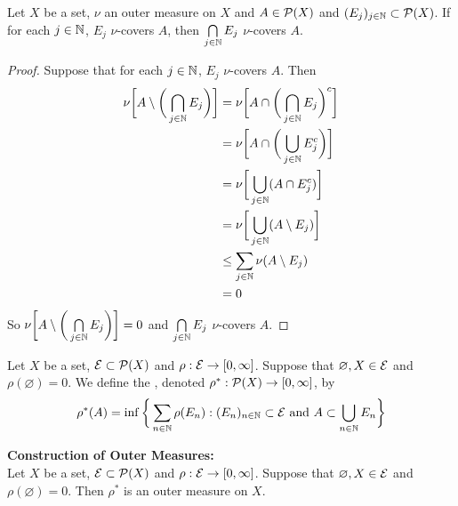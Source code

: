 \documentclass{book}
\begin{document}
	\begin{ex} 
		Let $X$ be a set, $\nu$ an outer measure on $X$ and $A \in \mathcal{P}(X)$ and $(E_j)_{j \in \mathbb{N}} \subset \mathcal{P}(X)$. If for each $j \in \mathbb{N}$, $E_j$ $\nu$-covers $A$, then $\bigcap\limits_{j \in \mathbb{N}} E_j$ $\nu$-covers $A$.
	\end{ex}

	\begin{proof}
		Suppose that for each $j \in \mathbb{N}$, $E_j$ $\nu$-covers $A$. Then 
		\begin{align*}
			\nu \bigg[ A \setminus \bigg( \bigcap_{j \in \mathbb{N}} E_j \bigg) \bigg]
			& = \nu \bigg[ A \cap \bigg( \bigcap_{j \in \mathbb{N}} E_j \bigg)^c \bigg] \\
			& = \nu \bigg[ A \cap \bigg( \bigcup_{j \in \mathbb{N}} E_j^c \bigg) \bigg] \\
			& = \nu \bigg[ \bigcup_{j \in \mathbb{N}} (A \cap E_j^c) \bigg] \\
			& = \nu \bigg[ \bigcup_{j \in \mathbb{N}} (A \setminus E_j) \bigg] \\
			& \leq \sum_{j \in \mathbb{N}} \nu(A \setminus E_j) \\
			& = 0
		\end{align*}
		So $\nu \bigg[ A \setminus \bigg( \bigcap\limits_{j \in \mathbb{N}} E_j \bigg) \bigg] = 0$ and $\bigcap\limits_{j \in \mathbb{N}} E_j$ $\nu$-covers $A$.
	\end{proof}

	
	\begin{defn}   
		Let $X$ be a set, $\mathcal{E} \subset \mathcal{P}(X)$ and $\rho: \mathcal{E} \rightarrow [0, \infty]$. Suppose that $\varnothing, X \in \mathcal{E}$ and $\rho(\varnothing) = 0$. We define the , denoted $\rho^*:\mathcal{P}(X) \rightarrow [0, \infty]$, by 
		$$\rho^*(A) = \inf \bigg \{\sum_{n \in \mathbb{N}}\rho(E_n): (E_n)_{n \in \mathbb{N}} \subset \mathcal{E} \text{ and }A \subset \bigcup_{n \in \mathbb{N}}E_n \bigg \}$$ 
	\end{defn}
	
	\begin{ex}\textbf{Construction of Outer Measures:}    \\
		Let $X$ be a set, $\mathcal{E} \subset \mathcal{P}(X)$ and $\rho: \mathcal{E} \rightarrow [0, \infty]$. Suppose that $\varnothing, X \in \mathcal{E}$ and $\rho(\varnothing) = 0$. Then $\rho^*$ is an outer measure on $X$.
	\end{ex}
	
\end{document}
